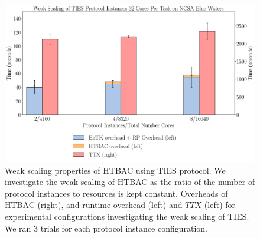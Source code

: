 



\begin{figure}
  \centering
    \includegraphics[width=\columnwidth]{figures/new_ws_ties.pdf}
    \caption{Weak scaling properties of HTBAC using TIES protocol. We
    investigate the weak scaling of HTBAC as the ratio of the number of
    protocol instances to resources is kept constant. Overheads of HTBAC
    (right), and runtime overhead (left) and \(TTX\) (left) for experimental
    configurations investigating the weak scaling of TIES. We ran 3 trials
    for each protocol instance configuration.}
\label{fig:weak_scaling_TIES}
\end{figure}

